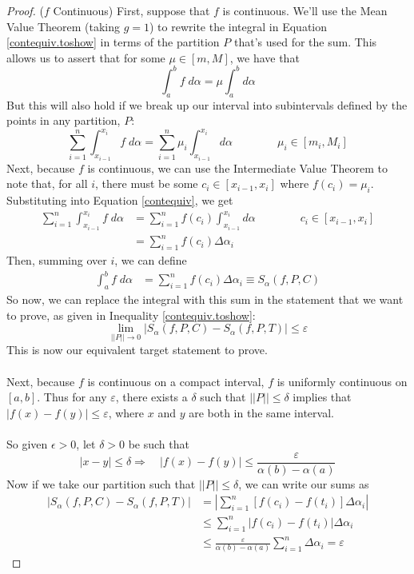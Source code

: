 \documentclass[12pt]{article}
\theoremstyle{plain}
\theoremstyle{definition}
\theoremstyle{remark}
\begin{document}
\begin{proof}($f$ Continuous)
First, suppose that $f$ is continuous. We'll use the Mean Value Theorem (taking $g=1$) to rewrite the integral in Equation \ref{contequiv.toshow} in terms of the partition $P$ that's used for the sum. This allows us to assert that for some $\mu \in [m,M]$, we have that
    \[ \int^b_a f \; d\alpha = \mu \int^b_a d\alpha \]
But this will also hold if we break up our interval into subintervals defined by the points in any partition, $P$:
\begin{equation}
    \label{contequiv}
    \sum^n_{i=1} \int^{x_i}_{x_{i-1}} f \; d\alpha 
        = \sum^n_{i=1} \mu_i \int^{x_i}_{x_{i-1}} d\alpha 
        \qquad\qquad \mu_i \in [m_i, M_i] 
\end{equation}
Next, because $f$ is continuous, we can use the Intermediate Value Theorem to note that, for all $i$, there must be some $c_i \in [x_{i-1}, x_i]$ where $f(c_i) = \mu_i$. Substituting into Equation \ref{contequiv}, we get
\begin{align*}
    \sum^n_{i=1} \int^{x_i}_{x_{i-1}} f \; d\alpha 
        &= \sum^n_{i=1} f(c_i) \int^{x_i}_{x_{i-1}} d\alpha 
        \qquad\qquad c_i \in [x_{i-1}, x_{i}] \\
        &= \sum^n_{i=1} f(c_i) \Delta\alpha_i
\end{align*}
Then, summing over $i$, we can define 
\begin{align*}
    \int^{b}_{a} f \; d\alpha 
        &= \sum^n_{i=1} f(c_i) \Delta\alpha_i
        \equiv S_\alpha(f,P,C)
\end{align*}
So now, we can replace the integral with this sum in the statement that we want to prove, as given in Inequality \ref{contequiv.toshow}:
\begin{equation}
    \label{contequiv.toshow2}
    \lim_{||P||\rightarrow 0}
    \left\lvert  S_\alpha(f,P,C)- S_\alpha(f,P,T) \right\rvert
        \leq \varepsilon
\end{equation}
This is now our equivalent target statement to prove.
\\
\\
Next, because $f$ is continuous on a compact interval, $f$ is uniformly continuous on $[a,b]$.  Thus for any $\varepsilon$, there exists a $\delta$ such that $||P||\leq\delta$ implies that $|f(x) - f(y)| \leq \varepsilon$, where $x$ and $y$ are both in the same interval.  
\\
\\
So given $\epsilon>0$, let $\delta>0$ be such that 
    \[ |x-y|\leq \delta \Rightarrow \quad |f(x)-f(y)| \leq 
        \frac{\varepsilon}{\alpha(b)-\alpha(a)} \]
Now if we take our partition such that $||P||\leq\delta$, we can write our sums as
\begin{align*}
    \left\lvert  S_\alpha(f,P,C)- S_\alpha(f,P,T) \right\rvert
    &= \left\lvert  \sum^n_{i=1} \left[f(c_i) - f(t_i) \right]
    \Delta\alpha_i\right\rvert  \\
    &\leq \sum^n_{i=1} \left\lvert  f(c_i) - f(t_i) \right\rvert
    \Delta\alpha_i  \\
    &\leq \frac{\varepsilon}{\alpha(b)-\alpha(a)}
        \sum^n_{i=1} \Delta\alpha_i =  \varepsilon 
\end{align*}
\end{proof}
\end{document}
